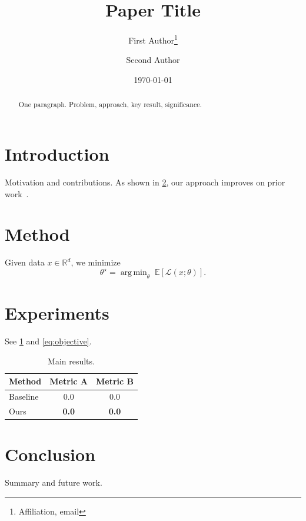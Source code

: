 \documentclass[11pt]{article}
\title{Paper Title}
\author{First Author\thanks{Affiliation, email} \and Second Author}
\date{\today}
\theoremstyle{definition}
\theoremstyle{remark}
\newcommand{\R}{\mathbb{R}}
\newcommand{\E}{\mathbb{E}}
\DeclareMathOperator*{\argmin}{arg\,min}
\begin{document}
\maketitle

\begin{abstract}
One paragraph. Problem, approach, key result, significance.
\end{abstract}

\section{Introduction}\label{sec:intro}
Motivation and contributions.
As shown in \cref{sec:method}, our approach improves on prior work~\cite{examplekey2024}.

\section{Method}\label{sec:method}
Given data $x \in \R^d$, we minimize
\begin{equation}\label{eq:objective}
  \theta^\star = \argmin_{\theta} \; \E\!\left[ \mathcal{L}(x; \theta) \right].
\end{equation}

\section{Experiments}\label{sec:experiments}
See \cref{tab:results} and \cref{eq:objective}.

\begin{table}[t]
  \centering
  \caption{Main results.}
  \label{tab:results}
  \begin{tabular}{lcc}
    \toprule
    Method & Metric A & Metric B \\
    \midrule
    Baseline & 0.0 & 0.0 \\
    Ours     & \textbf{0.0} & \textbf{0.0} \\
    \bottomrule
  \end{tabular}
\end{table}

\section{Conclusion}\label{sec:conclusion}
Summary and future work.

\printbibliography
\end{document}
